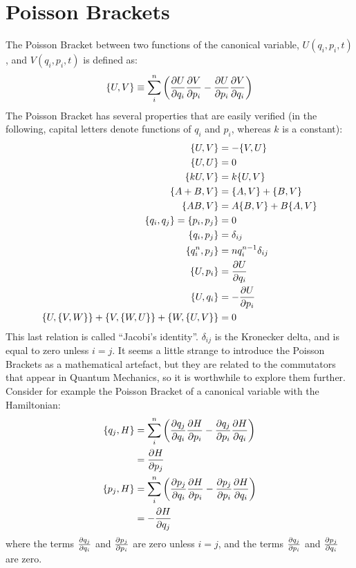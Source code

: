 \section{Poisson Brackets}
The Poisson Bracket between two functions of the canonical variable, $U(q_i,p_i,t)$, and $V(q_i, p_i, t)$ is defined as:
\begin{align}
\{U,V\}\equiv\sum_i^n\left(\frac{\partial U}{\partial q_i}\frac{\partial V}{\partial p_i}-\frac{\partial U}{\partial p_i}\frac{\partial V}{\partial q_i}\right)
\end{align}
The Poisson Bracket has several properties that are easily verified (in the following, capital letters denote functions of $q_i$ and $p_i$, whereas $k$ is a constant):
\begin{align}
\{U,V\}&=-\{V,U\}\nonumber\\
\{U,U\}&=0\nonumber\\
\{kU,V\}&=k\{U,V\}\nonumber\\
\{A+B,V\}&=\{A,V\}+\{B,V\}\nonumber\\
\{AB,V\}&=A\{B,V\}+B\{A,V\}\nonumber\\
\{q_i,q_j\}=\{p_i,p_j\}&=0\nonumber\\
\{q_i,p_j\}&=\delta_{ij}\nonumber\\
\{q_i^n,p_j\}&=nq_i^{n-1}\delta_{ij}\nonumber\\
\{U,p_i\}&=\frac{\partial U}{\partial q_i}\nonumber\\
\{U,q_i\}&=-\frac{\partial U}{\partial p_i}\nonumber\\
\{U,\{V,W\}\}+\{V,\{W,U\}\}+\{W,\{U,V\}\}&=0
\label{eqn:PBprops}
\end{align}
This last relation is called ``Jacobi's identity''. $\delta_{ij}$ is the Kronecker delta, and is equal to zero unless $i=j$. It seems a little strange to introduce the Poisson Brackets as a mathematical artefact, but they are related to the commutators that appear in Quantum Mechanics, so it is worthwhile to explore them further. Consider for example the Poisson Bracket of a canonical variable with the Hamiltonian:
\begin{align}
\{q_j,H\}&=\sum_i^n\left(\frac{\partial q_j}{\partial q_i}\frac{\partial H}{\partial p_i}-\frac{\partial q_j}{\partial p_i}\frac{\partial H}{\partial q_i}\right)\nonumber\\
&=\frac{\partial H}{\partial p_j}\nonumber\\
\{p_j,H\}&=\sum_i^n\left(\frac{\partial p_j}{\partial q_i}\frac{\partial H}{\partial p_i}-\frac{\partial p_j}{\partial p_i}\frac{\partial H}{\partial q_i}\right)\nonumber\\
&=-\frac{\partial H}{\partial q_j}\nonumber\\
\end{align}
where the terms $\frac{\partial q_j}{\partial q_i}$ and $\frac{\partial p_j}{\partial p_i}$ are zero unless $i=j$, and the terms $\frac{\partial q_j}{\partial p_i}$ and $\frac{\partial p_j}{\partial q_i}$ are zero.
